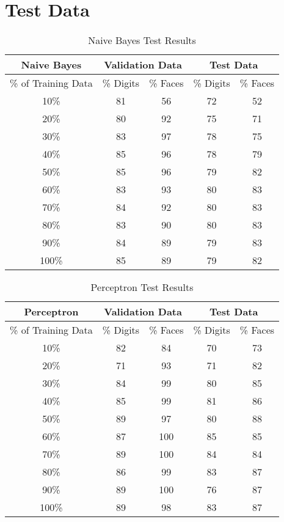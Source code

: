 \documentclass{article}
\begin{document}
\section{Test Data}
\begin{table}[H]
	\centering
	\caption{Naive Bayes Test Results}
	\begin{tabular}{|*{5}{c|}|}
		\hline
		Naive Bayes & \multicolumn{2}{c|}{Validation Data} & \multicolumn{2}{c|}{Test Data}  \\
		\hline
		\% of Training Data & \% Digits & \% Faces & \% Digits & \% Faces \\
		\hline
		10\%  & 81    & 56    & 72    & 52 \\
		20\%  & 80    & 92    & 75    & 71 \\
		30\%  & 83    & 97    & 78    & 75 \\
		40\%  & 85    & 96    & 78    & 79 \\
		50\%  & 85    & 96    & 79    & 82 \\
		60\%  & 83    & 93    & 80    & 83 \\
		70\%  & 84    & 92    & 80    & 83 \\
		80\%  & 83    & 90    & 80    & 83 \\
		90\%  & 84    & 89    & 79    & 83 \\
		100\% & 85    & 89    & 79    & 82 \\
		\hline
	\end{tabular}%
\end{table}%
\begin{table}[H]
	\centering
	\caption{Perceptron Test Results}
	\begin{tabular}{|*{5}{c|}|}
		\hline
		Perceptron & \multicolumn{2}{c|}{Validation Data} & \multicolumn{2}{c|}{Test Data} \\
		\hline
		\% of Training Data & \% Digits & \% Faces & \% Digits & \% Faces \\
		\hline
		10\%  & 82    & 84    & 70    & 73 \\
		20\%  & 71    & 93    & 71    & 82 \\
		30\%  & 84    & 99    & 80    & 85 \\
		40\%  & 85    & 99    & 81    & 86 \\
		50\%  & 89    & 97    & 80    & 88 \\
		60\%  & 87    & 100   & 85    & 85 \\
		70\%  & 89    & 100   & 84    & 84 \\
		80\%  & 86    & 99    & 83    & 87 \\
		90\%  & 89    & 100   & 76    & 87 \\
		100\% & 89    & 98    & 83    & 87 \\
		\hline
	\end{tabular}%
\end{table}%
\end{document}
